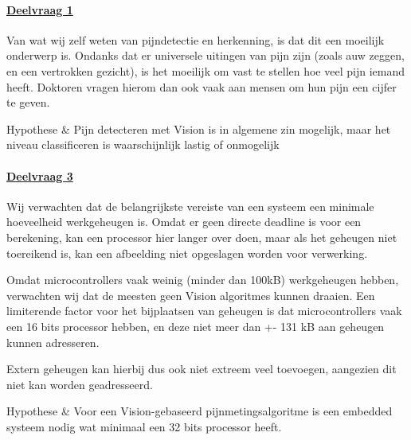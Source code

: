 \documentclass[11pt]{article}
\begin{document}
    \paragraph{\hyperref[itm:dv1]{Deelvraag 1}}
    Van wat wij zelf weten van pijndetectie en herkenning, is dat dit een moeilijk onderwerp is.
    Ondanks dat er universele uitingen van pijn zijn (zoals auw zeggen, en een vertrokken gezicht), is het moeilijk om vast te stellen hoe veel pijn iemand heeft.
    Doktoren vragen hierom dan ook vaak aan mensen om hun pijn een cijfer te geven.\\


    \begin{definition}
        Hypothese & Pijn detecteren met Vision is in algemene zin mogelijk, maar het niveau classificeren is waarschijnlijk lastig of onmogelijk
    \end{definition}


    \paragraph{\hyperref[itm:dv3]{Deelvraag 3}}
    Wij verwachten dat de belangrijkste vereiste van een systeem een minimale hoeveelheid werkgeheugen is.
    Omdat er geen directe deadline is voor een berekening, kan een processor hier langer over doen, maar als het geheugen niet toereikend is, kan een afbeelding niet opgeslagen worden voor verwerking.

    Omdat microcontrollers vaak weinig (minder dan 100kB) werkgeheugen hebben, verwachten wij dat de meesten geen Vision algoritmes kunnen draaien.
    Een limiterende factor voor het bijplaatsen van geheugen is dat microcontrollers vaak een 16 bits processor hebben, en deze niet meer dan +- 131 kB aan geheugen kunnen adresseren.

    Extern geheugen kan hierbij dus ook niet extreem veel toevoegen, aangezien dit niet kan worden geadresseerd.\\

    \begin{definition}
        Hypothese & Voor een Vision-gebaseerd pijnmetingsalgoritme is een embedded systeem nodig wat minimaal een 32 bits processor heeft.
    \end{definition}
\end{document}
